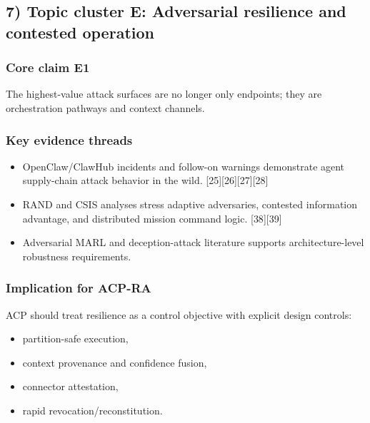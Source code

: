 \documentclass[11pt]{article}
\begin{document}
\hypertarget{topic-cluster-e-adversarial-resilience-and-contested-operation}{%
\subsection{7) Topic cluster E: Adversarial resilience and contested
operation}\label{topic-cluster-e-adversarial-resilience-and-contested-operation}}

\hypertarget{core-claim-e1}{%
\subsubsection{Core claim E1}\label{core-claim-e1}}

The highest-value attack surfaces are no longer only endpoints; they are
orchestration pathways and context channels.

\hypertarget{key-evidence-threads-4}{%
\subsubsection{Key evidence threads}\label{key-evidence-threads-4}}

\begin{itemize}
\tightlist
\item
  OpenClaw/ClawHub incidents and follow-on warnings demonstrate agent
  supply-chain attack behavior in the wild.
  {[}25{]}{[}26{]}{[}27{]}{[}28{]}
\item
  RAND and CSIS analyses stress adaptive adversaries, contested
  information advantage, and distributed mission command logic.
  {[}38{]}{[}39{]}
\item
  Adversarial MARL and deception-attack literature supports
  architecture-level robustness requirements.
\end{itemize}

\hypertarget{implication-for-acp-ra-4}{%
\subsubsection{Implication for ACP-RA}\label{implication-for-acp-ra-4}}

ACP should treat resilience as a control objective with explicit design
controls:

\begin{itemize}
\tightlist
\item
  partition-safe execution,
\item
  context provenance and confidence fusion,
\item
  connector attestation,
\item
  rapid revocation/reconstitution.
\end{itemize}
\end{document}

